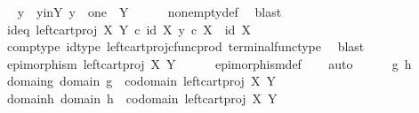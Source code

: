 \begin{isabellebody}
\ \isamarkupfalse%
\ y\ \ y{\isacharunderscore}{\kern0pt}in{\isacharunderscore}{\kern0pt}Y{\isacharcolon}{\kern0pt}\ {\isachardoublequoteopen}y\ {\isacharcolon}{\kern0pt}\ one\ {\isasymrightarrow}\ Y{\isachardoublequoteclose}\isanewline
\ \ \ \ \isamarkupfalse%
\ nonempty{\isacharunderscore}{\kern0pt}def\ \isamarkupfalse%
\ blast\isanewline
\ \ \isamarkupfalse%
\ \isamarkupfalse%
\ id{\isacharunderscore}{\kern0pt}eq{\isacharcolon}{\kern0pt}\ {\isachardoublequoteopen}{\isacharparenleft}{\kern0pt}left{\isacharunderscore}{\kern0pt}cart{\isacharunderscore}{\kern0pt}proj\ X\ Y{\isacharparenright}{\kern0pt}\ {\isasymcirc}\isactrlsub c\ {\isasymlangle}id\ X{\isacharcomma}{\kern0pt}\ y\ {\isasymcirc}\isactrlsub c\ {\isasymbeta}\isactrlbsub X\isactrlesub {\isasymrangle}\ {\isacharequal}{\kern0pt}\ id\ X{\isachardoublequoteclose}\isanewline
\ \ \ \ \isamarkupfalse%
\ comp{\isacharunderscore}{\kern0pt}type\ id{\isacharunderscore}{\kern0pt}type\ left{\isacharunderscore}{\kern0pt}cart{\isacharunderscore}{\kern0pt}proj{\isacharunderscore}{\kern0pt}cfunc{\isacharunderscore}{\kern0pt}prod\ terminal{\isacharunderscore}{\kern0pt}func{\isacharunderscore}{\kern0pt}type\ \isamarkupfalse%
\ blast\isanewline
\ \ \isamarkupfalse%
\ \isamarkupfalse%
\ {\isachardoublequoteopen}epimorphism\ {\isacharparenleft}{\kern0pt}left{\isacharunderscore}{\kern0pt}cart{\isacharunderscore}{\kern0pt}proj\ X\ Y{\isacharparenright}{\kern0pt}{\isachardoublequoteclose}\isanewline
\ \ \ \ \isamarkupfalse%
\ epimorphism{\isacharunderscore}{\kern0pt}def\isanewline
\ \ \isamarkupfalse%
\ auto\isanewline
\ \ \ \ \isamarkupfalse%
\ g\ h\isanewline
\ \ \ \ \isamarkupfalse%
\ domain{\isacharunderscore}{\kern0pt}g{\isacharcolon}{\kern0pt}\ {\isachardoublequoteopen}domain\ g\ {\isacharequal}{\kern0pt}\ codomain\ {\isacharparenleft}{\kern0pt}left{\isacharunderscore}{\kern0pt}cart{\isacharunderscore}{\kern0pt}proj\ X\ Y{\isacharparenright}{\kern0pt}{\isachardoublequoteclose}\isanewline
\ \ \ \ \isamarkupfalse%
\ domain{\isacharunderscore}{\kern0pt}h{\isacharcolon}{\kern0pt}\ {\isachardoublequoteopen}domain\ h\ {\isacharequal}{\kern0pt}\ codomain\ {\isacharparenleft}{\kern0pt}left{\isacharunderscore}{\kern0pt}cart{\isacharunderscore}{\kern0pt}proj\ X\ Y{\isacharparenright}{\kern0pt}{\isachardoublequoteclose}\isanewline
\ \ \ \ \isamarkupfalse%

\end{isabellebody}
